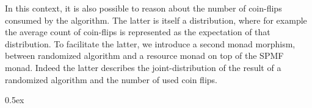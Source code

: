 \documentclass[11pt,a4paper]{article}
\begin{document}
In this context, it is also possible to reason about the number of coin-flips consumed by the
algorithm. The latter is itself a distribution, where for example the average count of coin-flips
is represented as the expectation of that distribution. To facilitate the latter, we introduce
a second monad morphism, between randomized algorithm and a resource monad on top of the SPMF monad.
Indeed the latter describes the joint-distribution of the result of a randomized algorithm and the 
number of used coin flips. 

\parindent 0pt\parskip 0.5ex
\end{document}
